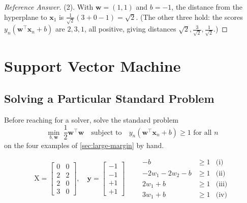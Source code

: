 \begin{proof}[Reference Answer]
    (2). With \(\bm{w} = (1, 1)\) and \(b = -1\), the distance from the
    hyperplane to \(\bm{x}_1\) is \(\frac{1}{\sqrt{2}} (3 + 0 - 1) =
    \sqrt{2}\). (The other three hold: the scores \(y_n(\bm{w}^\top \bm{x}_n
    + b)\) are \(2, 3, 1\), all positive, giving distances \(\sqrt{2},
    \frac{3}{\sqrt{2}}, \frac{1}{\sqrt{2}}\).)
\end{proof}

\section{Support Vector Machine}\label{sec:svm}


\subsection{Solving a Particular Standard Problem}

Before reaching for a solver, solve the standard problem
\[
    \min_{b, \bm{w}} \ \frac{1}{2} \bm{w}^\top \bm{w} \quad \text{subject
    to} \quad y_n (\bm{w}^\top \bm{x}_n + b) \ge 1 \text{ for all } n
\]
on the four examples of \autoref{sec:large-margin} by hand.

\begin{center}
    \begin{minipage}[c]{0.66\textwidth}
        \[
            \mathrm{X} = \begin{bmatrix} 0 & 0 \\ 2 & 2 \\ 2 & 0 \\ 3 & 0
            \end{bmatrix}, \quad
            \bm{y} = \begin{bmatrix} -1 \\ -1 \\ +1 \\ +1 \end{bmatrix}
            \qquad
            \begin{aligned}
                -b &\ge 1 & \text{(i)}\\
                -2w_1 - 2w_2 - b &\ge 1 & \text{(ii)}\\
                2w_1 + b &\ge 1 & \text{(iii)}\\
                3w_1 + b &\ge 1 & \text{(iv)}
            \end{aligned}
        \]
    \end{minipage}%
    \hfill
    \begin{minipage}[c]{0.3\textwidth}
        \centering
    \end{minipage}
\end{center}

